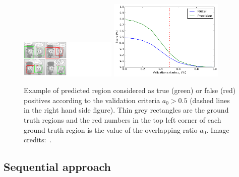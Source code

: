     \begin{figure}[ht]%
      \centering
      \includegraphics[trim= 0mm 0mm 190mm 0mm, clip, width=0.41\textwidth]{characters_overlap_ratio.png}
      \includegraphics[trim= 0mm 0mm 0mm 0mm, clip, width=0.49\textwidth]{overlap_ratio_evolution.pdf}
      \caption[Example of comic character region prediction]{Example of predicted region considered as true (green) or false (red) positives according to the validation criteria $a_0>0.5$ (dashed lines in the right hand side figure). Thin grey rectangles are the ground truth regions and the red numbers in the top left corner of each ground truth region is the value of the overlapping ratio $a_0$. Image credits:~\cite{Magicien11}.}
      \label{fig:ex:characters_overlap_ratio}
    \end{figure}  


\subsection{Sequential approach} %

